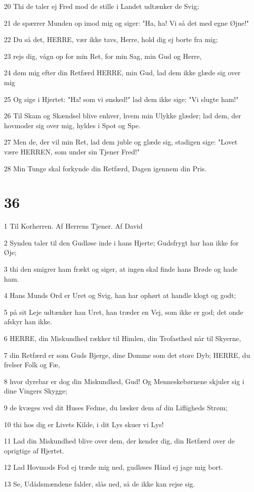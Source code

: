 \par 20 Thi de taler ej Fred mod de stille i Landet udtænker de Svig;
\par 21 de spærrer Munden op imod mig og siger: "Ha, ha! Vi så det med egne Øjne!"
\par 22 Du så det, HERRE, vær ikke tavs, Herre, hold dig ej borte fra mig;
\par 23 rejs dig, vågn op for min Ret, for min Sag, min Gud og Herre,
\par 24 døm mig efter din Retfærd HERRE, min Gud, lad dem ikke glæde sig over mig
\par 25 Og sige i Hjertet: "Ha! som vi ønsked!" lad dem ikke sige: "Vi slugte ham!"
\par 26 Til Skam og Skændsel blive enhver, hvem min Ulykke glæder; lad dem, der hovmoder sig over mig, hyldes i Spot og Spe.
\par 27 Men de, der vil min Ret, lad dem juble og glæde sig, stadigen sige: "Lovet være HERREN, som under sin Tjener Fred!"
\par 28 Min Tunge skal forkynde din Retfærd, Dagen igennem din Pris.

\chapter{36}

\par 1 Til Korherren. Af Herrens Tjener. Af David
\par 2 Synden taler til den Gudløse inde i hans Hjerte; Gudsfrygt har han ikke for Øje;
\par 3 thi den smigrer ham frækt og siger, at ingen skal finde hans Brøde og hade ham.
\par 4 Hans Munds Ord er Uret og Svig, han har ophørt at handle klogt og godt;
\par 5 på sit Leje udtænker han Uret, han træder en Vej, som ikke er god; det onde afskyr han ikke.
\par 6 HERRE, din Miskundhed rækker til Himlen, din Trofasthed når til Skyerne,
\par 7 din Retfærd er som Guds Bjerge, dine Domme som det store Dyb; HERRE, du frelser Folk og Fæ,
\par 8 hvor dyrebar er dog din Miskundhed, Gud! Og Menneskebørnene skjuler sig i dine Vingers Skygge;
\par 9 de kvæges ved dit Huses Fedme, du læsker dem af din Lifligheds Strøm;
\par 10 thi hos dig er Livets Kilde, i dit Lys skuer vi Lys!
\par 11 Lad din Miskundhed blive over dem, der kender dig, din Retfærd over de oprigtige af Hjertet.
\par 12 Lad Hovmods Fod ej træde mig ned, gudløses Hånd ej jage mig bort.
\par 13 Se, Udådsmændene falder, slås ned, så de ikke kan rejse sig.

